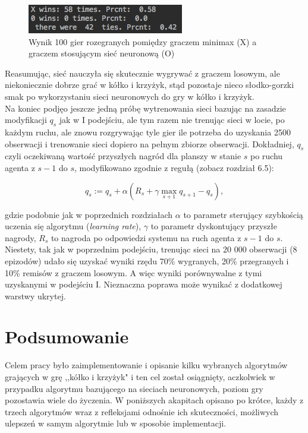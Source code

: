 \documentclass[licencjacka]{pracamgr}
\begin{document}
\begin{figure}[h!]
	\includegraphics [scale=0.7] {nn2_4.png}
	\caption{Wynik 100 gier rozegranych pomiędzy graczem minimax (X) a graczem stosującym sieć neuronową (O)}
	\label{Rys33}
\end{figure} 

Reasumując, sieć nauczyła się skutecznie wygrywać z graczem losowym, ale niekoniecznie dobrze grać w kółko i krzyżyk, stąd pozostaje nieco słodko-gorzki smak po wykorzystaniu sieci neuronowych do gry w kółko i krzyżyk.\\

Na koniec podjęo jeszcze jedną próbę wytrenowania sieci bazując na zasadzie modyfikacji $q_{s}$ jak w I podejściu, ale tym razem nie trenując sieci w locie, po każdym ruchu, ale znowu rozgrywając tyle gier ile potrzeba do uzyskania 2500 obserwacji i trenowanie sieci dopiero na pełnym zbiorze obserwacji. Dokładniej,  $q_{s}$ czyli oczekiwaną wartość przyszłych nagród dla planszy w stanie $s$ po ruchu agenta z $s-1$ do $s$, modyfikowano zgodnie z regułą (zobacz \cite{RL} rozdział 6.5):

$$q_{s} := q_{s} + \alpha(R_{s}+\gamma\max_{s+1}q_{s+1}-q_{s}),$$

gdzie podobnie jak w poprzednich rozdziałach $\alpha$ to parametr sterujący szybkością uczenia się algorytmu (\textit{learning rate}), $\gamma$ to parametr dyskontujący przyszłe nagrody, $R_{s}$ to nagroda po odpowiedzi systemu na ruch agenta z $s-1$ do $s$. Niestety, tak jak w poprzednim podejściu, trenując sieci na 20 000 obserwacji (8 epizodów) udało się uzyskać wyniki rzędu 70\%  wygranych, 20\% przegranych i 10\% remisów z graczem losowym. A więc wyniki porównywalne z tymi uzyskanymi w podejściu I. Nieznaczna poprawa może wynikać z dodatkowej warstwy ukrytej. 
  

\chapter{Podsumowanie}
Celem pracy było zaimplementowanie i opisanie kilku wybranych algorytmów grających w grę ,,kółko i krzyżyk" i ten cel został osiągnięty,  aczkolwiek w przypadku algorytmu bazującego na sieciach neuronowych, poziom gry pozostawia wiele do życzenia.  W poniższych akapitach opisano po krótce, każdy z trzech algorytmów wraz z refleksjami odnośnie ich skuteczności,  możliwych ulepszeń w samym algorytmie lub w sposobie implementacji.\\
\end{document}
